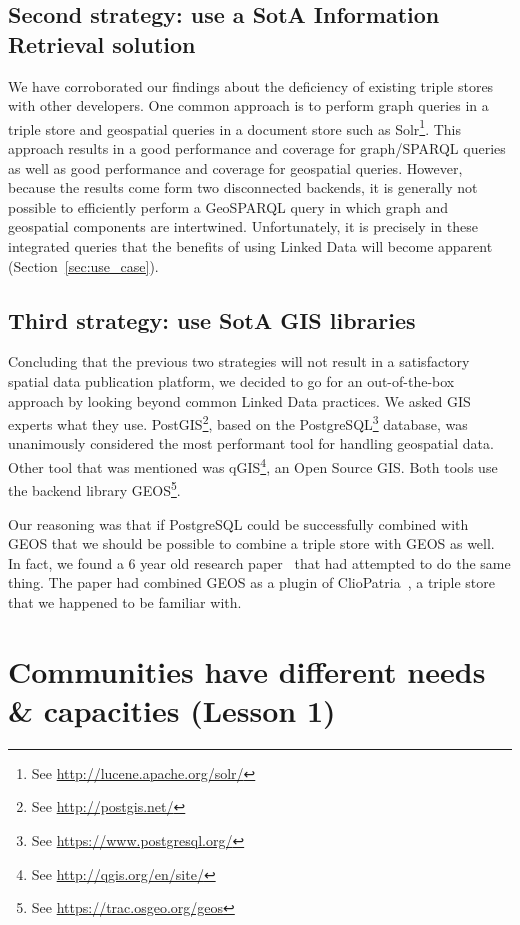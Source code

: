 \documentclass[a4paper]{scrartcl}
\newcommand{\seeUrl}[1]{\footnote{See \mbox{\url{#1}}}}
\begin{document}
\subsection{Second strategy: use a SotA Information Retrieval solution}

We have corroborated our findings about the deficiency of existing
triple stores with other developers.  One common approach is to
perform graph queries in a triple store and geospatial queries in a
document store such as Solr\seeUrl{http://lucene.apache.org/solr/}.
This approach results in a good performance and coverage for
graph/SPARQL queries as well as good performance and coverage for
geospatial queries.  However, because the results come form two
disconnected backends, it is generally not possible to efficiently
perform a GeoSPARQL query in which graph and geospatial components are
intertwined.  Unfortunately, it is precisely in these integrated
queries that the benefits of using Linked Data will become apparent
(Section~\ref{sec:use_case}).


\subsection{Third strategy: use SotA GIS libraries}

Concluding that the previous two strategies will not result in a
satisfactory spatial data publication platform, we decided to go for
an out-of-the-box approach by looking beyond common Linked Data
practices.  We asked GIS experts what they use.
PostGIS\seeUrl{http://postgis.net/}, based on the
PostgreSQL\seeUrl{https://www.postgresql.org/} database, was
unanimously considered the most performant tool for handling
geospatial data.  Other tool that was mentioned was
qGIS\seeUrl{http://qgis.org/en/site/}, an Open Source GIS.  Both tools
use the backend library GEOS\seeUrl{https://trac.osgeo.org/geos}.

Our reasoning was that if PostgreSQL could be successfully combined
with GEOS that we should be possible to combine a triple store with
GEOS as well.  In fact, we found a 6 year old research
paper~\cite{VanHage2010} that had attempted to do the same thing.  The
paper had combined GEOS as a plugin of
ClioPatria~\cite{Wielemaker2015}, a triple store that we happened to be
familiar with.


\section{Communities have different needs \& capacities (Lesson 1)}
\label{sec:result_set_formats}
\end{document}
